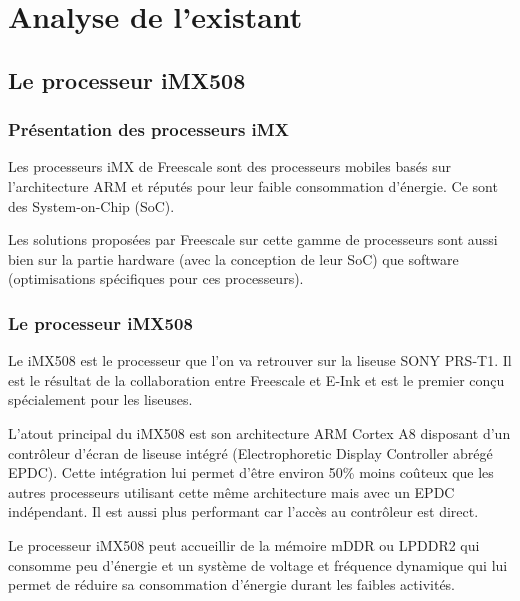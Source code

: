 \chapter{Analyse de l'existant}

\section{Le processeur iMX508}

\subsection{Présentation des processeurs iMX}

Les processeurs iMX de Freescale sont des processeurs mobiles basés sur l'architecture ARM et réputés pour leur faible consommation d'énergie. Ce sont des System-on-Chip (SoC).


Les solutions proposées par Freescale sur cette gamme de processeurs sont aussi bien sur la partie hardware (avec la conception de leur SoC) que software (optimisations spécifiques pour ces processeurs).

\subsection{Le processeur iMX508}

Le iMX508 est le processeur que l'on va retrouver sur la liseuse SONY PRS-T1. Il est le résultat de la collaboration entre Freescale et E-Ink et est le premier conçu spécialement pour les liseuses. 

L'atout principal du iMX508 est son architecture ARM Cortex A8 disposant d'un contrôleur d'écran de liseuse intégré (Electrophoretic Display Controller abrégé EPDC). Cette intégration lui permet d'être environ 50\% moins coûteux que les autres processeurs utilisant cette même architecture mais avec un EPDC indépendant. Il est aussi plus performant car l'accès au contrôleur est direct.

Le processeur iMX508 peut accueillir de la mémoire mDDR ou LPDDR2 qui consomme peu d'énergie et un système de voltage et fréquence dynamique qui lui permet de réduire sa consommation d'énergie durant les faibles activités.

